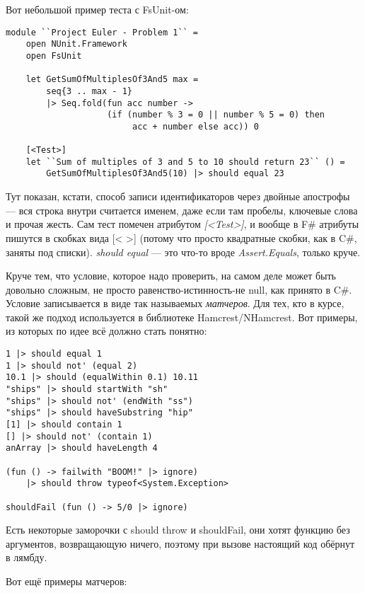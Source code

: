 \documentclass[a5paper]{article}
\begin{document}
Вот небольшой пример теста с FsUnit-ом:

\begin{verbatim}
module ``Project Euler - Problem 1`` =
    open NUnit.Framework
    open FsUnit

    let GetSumOfMultiplesOf3And5 max =
        seq{3 .. max - 1} 
        |> Seq.fold(fun acc number ->
                    (if (number % 3 = 0 || number % 5 = 0) then
                         acc + number else acc)) 0

    [<Test>]
    let ``Sum of multiples of 3 and 5 to 10 should return 23`` () =
        GetSumOfMultiplesOf3And5(10) |> should equal 23
\end{verbatim}

Тут показан, кстати, способ записи идентификаторов через двойные апострофы --- вся строка внутри считается именем, даже если там пробелы, ключевые слова и прочая жесть. Сам тест помечен атрибутом \textit{[<Test>]}, и вообще в F\# атрибуты пишутся в скобках вида [< >] (потому что просто квадратные скобки, как в C\#, заняты под списки). \textit{should equal} --- это что-то вроде \textit{Assert.Equals}, только круче.

Круче тем, что условие, которое надо проверить, на самом деле может быть довольно сложным, не просто равенство-истинность-не null, как принято в C\#. Условие записывается в виде так называемых \textit{матчеров}. Для тех, кто в курсе, такой же подход используется в библиотеке Hamcrest/NHamcrest. Вот примеры, из которых по идее всё должно стать понятно:

\begin{verbatim}
1 |> should equal 1
1 |> should not' (equal 2)
10.1 |> should (equalWithin 0.1) 10.11
"ships" |> should startWith "sh"
"ships" |> should not' (endWith "ss")
"ships" |> should haveSubstring "hip"
[1] |> should contain 1
[] |> should not' (contain 1)
anArray |> should haveLength 4

(fun () -> failwith "BOOM!" |> ignore) 
    |> should throw typeof<System.Exception>

shouldFail (fun () -> 5/0 |> ignore)
\end{verbatim}

Есть некоторые заморочки с should throw и shouldFail, они хотят функцию без аргументов, возвращающую ничего, поэтому при вызове настоящий код обёрнут в лямбду.

Вот ещё примеры матчеров:
\end{document}
